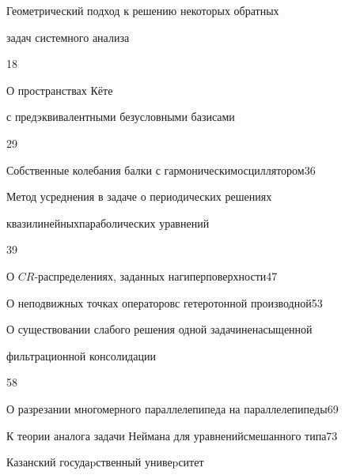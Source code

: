 

{Геометрический подход к решению некоторых обратных \newline


задач системного анализа}{18}




{О пространствах К\"ете 


с предэквивалентными безусловными базисами}{29}




{Собственные колебания балки с гармоническим\newline осциллятором}{36}




{Метод усреднения в задаче о периодических решениях 


квазилинейных\newline параболических уравнений}{39}




{О $CR$-распределениях, заданных на\newline гиперповерхности}{47}




{О неподвижных точках операторов\newline с гетеротонной производной}{53}




{О существовании слабого решения одной задачи\newline ненасыщенной


фильтрационной консолидации}{58}




{О разрезании многомерного параллелепипеда на параллелепипеды}{69}




{К теории аналога задачи Неймана для уравнений\newline смешанного типа}{73}








\vfill


\noindent\raisebox{2pt}{\copyright} Казанский госудаpственный унивеpситет





